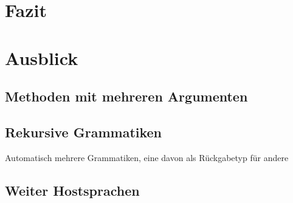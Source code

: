 \documentclass[../InterneDSLs.tex]{subfiles}
\begin{document}
\chapter{Fazit}

\chapter{Ausblick}
\section{Methoden mit mehreren Argumenten}
\section{Rekursive Grammatiken}
Automatisch mehrere Grammatiken, eine davon als Rückgabetyp für andere

\section{Weiter Hostsprachen}
\end{document}
